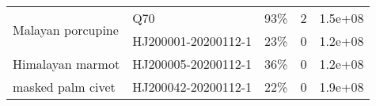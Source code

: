 \begin{tabular}{llrrr}
\cline{1-5}
\multirow{2}{*}{Malayan porcupine} & Q70 &                                       93\% &                        2 &                   1.5e+08 \\
                  & HJ200001-20200112-1 &                                       23\% &                        0 &                   1.2e+08 \\
\cline{1-5}
Himalayan marmot & HJ200005-20200112-1 &                                       36\% &                        0 &                   1.2e+08 \\
masked palm civet & HJ200042-20200112-1 &                                       22\% &                        0 &                   1.9e+08 \\
\bottomrule
\end{tabular}
